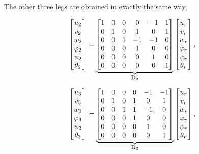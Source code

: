 The other three legs are obtained in exactly the same way,

\begin{equation}
    \begin{bmatrix}
        u_2\\v_2\\w_2\\\varphi_2\\\psi_2\\\theta_2
    \end{bmatrix}
    =
    \underbrace{\begin{bmatrix}
        1&0&0& 0&-1& 1\\
        0&1&0& 1& 0& 1\\
        0&0&1&-1&-1& 0\\
        0&0&0& 1& 0& 0\\
        0&0&0& 0& 1& 0\\
        0&0&0& 0& 0& 1
    \end{bmatrix}}_{\mathbf{D}_2}
    \begin{bmatrix}
        u_r\\v_r\\w_r\\\varphi_r\\\psi_r\\\theta_r
    \end{bmatrix},
\end{equation}

\begin{equation}
    \begin{bmatrix}
        u_3\\v_3\\w_3\\\varphi_3\\\psi_3\\\theta_3
    \end{bmatrix}
    =
    \underbrace{\begin{bmatrix}
        1&0&0& 0&-1&-1\\
        0&1&0& 1& 0& 1\\
        0&0&1& 1&-1& 0\\
        0&0&0& 1& 0& 0\\
        0&0&0& 0& 1& 0\\
        0&0&0& 0& 0& 1
    \end{bmatrix}}_{\mathbf{D}_3}
    \begin{bmatrix}
        u_r\\v_r\\w_r\\\varphi_r\\\psi_r\\\theta_r
    \end{bmatrix},
\end{equation}

